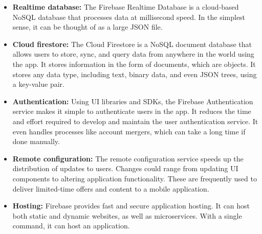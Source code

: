 \begin{itemize}
	\item \textbf{Realtime database:} The Firebase Realtime Database is a cloud-based NoSQL database that processes data at millisecond speed. In the simplest sense, it can be thought of as a large JSON file.
 \item \textbf{Cloud firestore:} The Cloud Firestore is a NoSQL document database that allows users to store, sync, and query data from anywhere in the world using the app. It stores information in the form of documents, which are objects. It stores any data type, including text, binary data, and even JSON trees, using a key-value pair.
 \item \textbf{Authentication:} Using UI libraries and SDKs, the Firebase Authentication service makes it simple to authenticate users in the app. It reduces the time and effort required to develop and maintain the user authentication service. It even handles processes like account mergers, which can take a long time if done manually.
 \item \textbf{Remote configuration:} The remote configuration service speeds up the distribution of updates to users. Changes could range from updating UI components to altering application functionality. These are frequently used to deliver limited-time offers and content to a mobile application.
 \item \textbf{Hosting:} Firebase provides fast and secure application hosting. It can host both static and dynamic websites, as well as microservices. With a single command, it can host an application.
\end{itemize}
